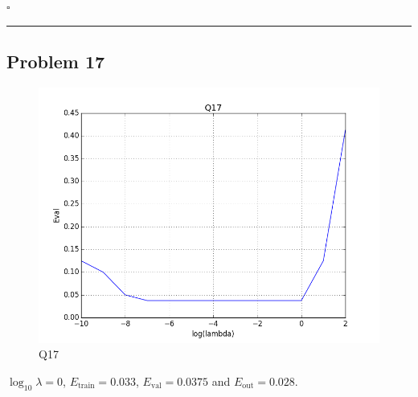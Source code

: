 \documentclass[12pt]{article}
\newcommand*{\QEDB}{\hfill\ensuremath{\square}}
\newcommand{\horrule}[1]{\rule{\linewidth}{#1}}
\begin{document}
\QEDB

\horrule{0.5pt}

\subsection*{Problem 17}

\begin{figure}[h]
	\centering
	\includegraphics[scale=0.3]{Q17.png}
	\caption{Q17}
	\label{Q17}
\end{figure}
$\log_{10}\lambda=0$, $E_{\text{train}}=0.033$, $E_{\text{val}}=0.0375$ and $E_{\text{out}}=0.028$.

\end{document}
